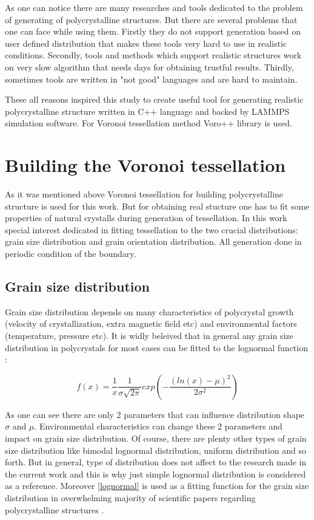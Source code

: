 \documentclass[12pt]{report}
\begin{document}
As one can notice there are many researches and tools dedicated to the problem of generating of polycrystalline structures. But there are several problems that one can face while using them. Firstly they do not support generation based on user defined distribution that makes these tools very hard to use in realistic conditions. Secondly, tools and methods which support realistic structures work on very slow algorithm that needs days for obtaining trustful results. Thirdly, sometimes tools are written in "not good" languages and are hard to maintain.

These all reasons inspired this study to create useful tool for generating realistic polycrystalline structure written in C++ language and backed by LAMMPS simulation software. For Voronoi tessellation method Voro++ library is used.

\section{Building the Voronoi tessellation}

As it was mentioned above Voronoi tessellation for building polycrystalline structure is used for this work. But for obtaining real stucture one has to fit some properties of natural crystalls during generation of tessellation. In this work special interest dedicated in fitting tessellation to the two crucial distributions: grain size distribution and grain orientation distribution. All generation done in periodic condition of the boundary.

\subsection{Grain size distribution}

Grain size distribution depends on many characteristics of polycrystal growth (velocity of crystallization, extra magnetic field etc) and environmental factors (temperature, pressure etc). It is widly beleived that in general any grain size distribution in polycrystals for most cases can be fitted to the lognormal function \cite{shen15, liu14}:

\begin{equation} \label{lognormal}
f(x) = \frac{1}{x} \frac{1}{\sigma \sqrt{2\pi}}exp(-\frac{(ln(x) - \mu)^2}{2\sigma^2})
\end{equation}
\bigbreak

As one can see there are only 2 parameters that can influence distribution shape $ \sigma $ and $ \mu $. Environmental characteristics can change these 2 parameters and impact on grain size distribution. Of course, there are plenty other types of grain size distribution like bimodal lognormal distribution, uniform distribution and so forth. But in general, type of distribution does not affect to the research made in the current work and this is why just simple lognormal distribution is considered as a reference. Moreover \ref{lognormal} is used as a fitting function for the grain size distribution in overwhelming majority of scientific papers regarding polycrystalline structures \cite{shen15, liu14}.
\end{document}
